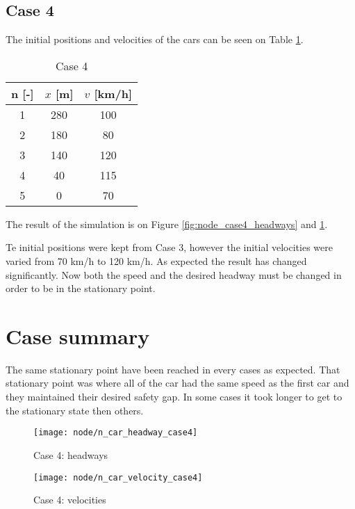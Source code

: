 		\subsection*{Case 4}
		The initial positions and velocities of the cars can be seen on Table \ref{tab:node_case4}.
		\begin{table}
			\centering
			\begin{tabular}{ |c|c|c| }
				\hline
				n [-] & $x$ [m] & $v$ [km/h]\\
				\hline
				1 &  280 & 100 \\
				2 & 180 & 80 \\
				3 & 140 & 120 \\
				4 & 40 & 115 \\
				5 & 0 & 70 \\
				\hline
			\end{tabular}
			\caption{Case 4}
			\label{tab:node_case4}
		\end{table}
		The result of the simulation is on Figure \ref{fig:node_case4_headways} and \ref{fig:node_case4_velocities}. 

		Te initial positions were kept from Case 3, however the initial velocities were varied from 70 km/h to 120 km/h. As expected the result has changed significantly. Now both the speed and the desired headway must be changed in order to be in the stationary point.
		\section*{Case summary}
		The same stationary point have been reached in every cases as expected. That stationary point was where all of the car had the same speed as the first car and they maintained their desired safety gap. In some cases it took longer to get to the stationary state then others.
		\begin{figure}
			\centering
			\begin{minipage}{.5\textwidth}
				\centering
				\texttt{[image: node/n\_car\_headway\_case4]}
				\caption{Case 4: headways}
				\label{fig:node_case4_headways}
			\end{minipage}\hfill
			\begin{minipage}{.5\textwidth}
				\centering
				\texttt{[image: node/n\_car\_velocity\_case4]}
				\caption{Case 4: velocities}
				\label{fig:node_case4_velocities}
			\end{minipage}
		\end{figure}
